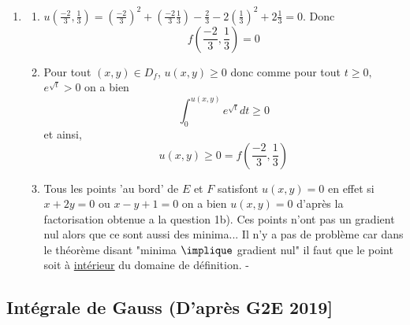 \begin{correction}
\begin{enumerate}
\begin{enumerate}
\end{enumerate}
\item \begin{enumerate}
\item $u\left(\frac{-2}{3},\frac{1}{3}\right) =\left(\frac{-2}{3}\right)^2 +\left(\frac{-2}{3} \frac{1}{3}\right)  -\frac{2}{3}  -2 \left(\frac{1}{3}\right)^2 +2 \frac{1}{3} = 0$. Donc 
$$f\left(\frac{-2}{3},\frac{1}{3}\right) = 0$$
\item Pour tout $(x,y) \in D_f$, $u(x,y) \geq 0$ donc comme pour tout $t\geq 0, $  $e^{\sqrt{t}}>0$ on  a bien 
$$\int_0^{u(x,y)} e^{\sqrt{t}} dt \geq 0$$
et ainsi, $$u(x,y) \geq 0 =f\left(\frac{-2}{3},\frac{1}{3}\right)  $$
\item Tous les points 'au bord' de $E$ et $F$ satisfont $u(x,y)=0$ en effet si 
$x+2y = 0 $ ou $x-y+1=0$ on a bien $u(x,y) =0$ d'après la factorisation obtenue a la question 1b). 
Ces points n'ont pas un gradient nul alors que ce sont aussi des minima... Il n'y a pas de problème car dans le théorème disant "minima $\implique$ gradient nul" il faut que le point soit à \underline{intérieur} du domaine de définition. -
\end{enumerate}
\end{enumerate}

\end{correction}







\subsection{Intégrale de Gauss (D'après G2E 2019]}

